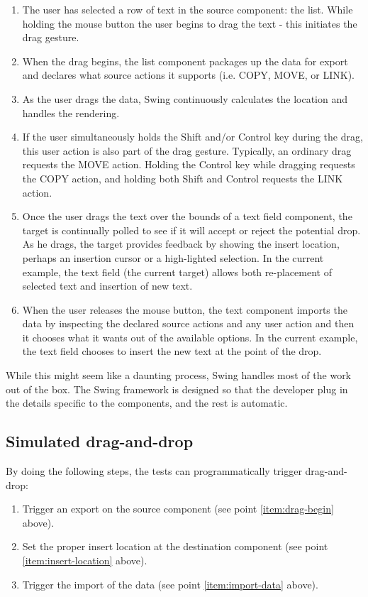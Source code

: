 \begin{enumerate}
\item The user has selected a row of text in the source component: the list. While holding the mouse button the user begins to drag the text - this initiates the drag gesture.
\item \label{item:drag-begin} When the drag begins, the list component packages up the data for export and declares what source actions it supports (i.e. COPY, MOVE, or LINK).
\item As the user drags the data, Swing continuously calculates the location and handles the rendering.
\item If the user simultaneously holds the Shift and/or Control key during the drag, this user action is also part of the drag gesture. Typically, an ordinary drag requests the MOVE action. Holding the Control key while dragging requests the COPY action, and holding both Shift and Control requests the LINK action.
\item \label{item:insert-location} Once the user drags the text over the bounds of a text field component, the target is continually polled to see if it will accept or reject the potential drop. As he drags, the target provides feedback by showing the insert location, perhaps an insertion cursor or a high-lighted selection. In the current example, the text field (the current target) allows both re-placement of selected text and insertion of new text.
\item \label{item:import-data} When the user releases the mouse button, the text component imports the data by inspecting the declared source actions and any user action and then it chooses what it wants out of the available options. In the current example, the text field chooses to insert the new text at the point of the drop.
\end{enumerate}

While this might seem like a daunting process, Swing handles most of the work out of the box. The Swing framework is designed so that the developer plug in the details specific to the components, and the rest is automatic.

\subsection {Simulated drag-and-drop}\label{sec:simulated-dnd}

By doing the following steps, the tests can programmatically trigger drag-and-drop:
\begin{enumerate}
\item Trigger an export on the source component (see point \ref{item:drag-begin} above).
\item Set the proper insert location at the destination component (see point \ref{item:insert-location} above).
\item Trigger the import of the data (see point \ref{item:import-data} above).
\end{enumerate}











